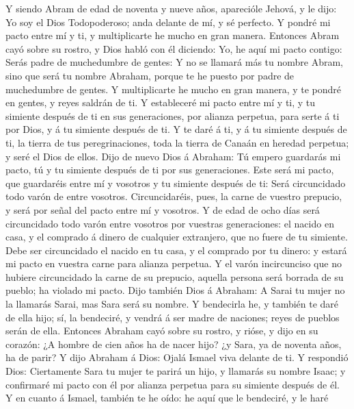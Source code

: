  Y siendo Abram de edad de noventa y nueve años, aparecióle
Jehová, y le dijo: Yo soy el Dios Todopoderoso; anda delante de mí, y sé
perfecto.  Y pondré mi pacto entre mí y ti, y multiplicarte
he mucho en gran manera.  Entonces Abram cayó sobre su
rostro, y Dios habló con él diciendo:  Yo, he aquí mi pacto
contigo: Serás padre de muchedumbre de gentes:  Y no se
llamará más tu nombre Abram, sino que será tu nombre Abraham, porque te
he puesto por padre de muchedumbre de gentes.  Y
multiplicarte he mucho en gran manera, y te pondré en gentes, y reyes
saldrán de ti.  Y estableceré mi pacto entre mí y ti, y tu
simiente después de ti en sus generaciones, por alianza perpetua, para
serte á ti por Dios, y á tu simiente después de ti.  Y te
daré á ti, y á tu simiente después de ti, la tierra de tus
peregrinaciones, toda la tierra de Canaán en heredad perpetua; y seré el
Dios de ellos.  Dijo de nuevo Dios á Abraham: Tú empero
guardarás mi pacto, tú y tu simiente después de ti por sus generaciones.
 Este será mi pacto, que guardaréis entre mí y vosotros y
tu simiente después de ti: Será circuncidado todo varón de entre
vosotros.  Circuncidaréis, pues, la carne de vuestro
prepucio, y será por señal del pacto entre mí y vosotros. 
Y de edad de ocho días será circuncidado todo varón entre vosotros por
vuestras generaciones: el nacido en casa, y el comprado á dinero de
cualquier extranjero, que no fuere de tu simiente.  Debe
ser circuncidado el nacido en tu casa, y el comprado por tu dinero: y
estará mi pacto en vuestra carne para alianza perpetua.  Y
el varón incircunciso que no hubiere circuncidado la carne de su
prepucio, aquella persona será borrada de su pueblo; ha violado mi
pacto.  Dijo también Dios á Abraham: A Sarai tu mujer no la
llamarás Sarai, mas Sara será su nombre.  Y bendecirla he,
y también te daré de ella hijo; sí, la bendeciré, y vendrá á ser madre
de naciones; reyes de pueblos serán de ella.  Entonces
Abraham cayó sobre su rostro, y rióse, y dijo en su corazón: ¿A hombre
de cien años ha de nacer hijo? ¿y Sara, ya de noventa años, ha de parir?
 Y dijo Abraham á Dios: Ojalá Ismael viva delante de ti.
 Y respondió Dios: Ciertamente Sara tu mujer te parirá un
hijo, y llamarás su nombre Isaac; y confirmaré mi pacto con él por
alianza perpetua para su simiente después de él.  Y en
cuanto á Ismael, también te he oído: he aquí que le bendeciré, y le haré
